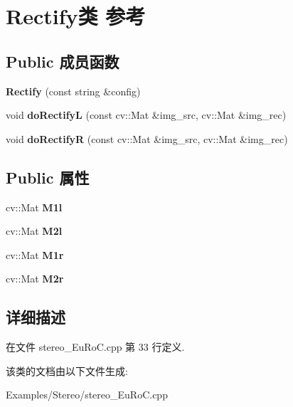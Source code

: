 \hypertarget{classRectify}{\section{Rectify类 参考}
\label{classRectify}
}
\subsection*{Public 成员函数}
\begin{DoxyCompactItemize}
\item 
\hypertarget{classRectify_af902b42675372fe6d368d7db9f8f4aeb}{{\bfseries Rectify} (const string \&config)}\label{classRectify_af902b42675372fe6d368d7db9f8f4aeb}

\item 
\hypertarget{classRectify_ab13cffcfad378e7fe0e2acc30b34b898}{void {\bfseries do\-Rectify\-L} (const cv\-::\-Mat \&img\-\_\-src, cv\-::\-Mat \&img\-\_\-rec)}\label{classRectify_ab13cffcfad378e7fe0e2acc30b34b898}

\item 
\hypertarget{classRectify_a730bcf1354cf3235bc968e6614fac588}{void {\bfseries do\-Rectify\-R} (const cv\-::\-Mat \&img\-\_\-src, cv\-::\-Mat \&img\-\_\-rec)}\label{classRectify_a730bcf1354cf3235bc968e6614fac588}

\end{DoxyCompactItemize}
\subsection*{Public 属性}
\begin{DoxyCompactItemize}
\item 
\hypertarget{classRectify_a2bccf95a2c08fd34ecba598b6ace5f3b}{cv\-::\-Mat {\bfseries M1l}}\label{classRectify_a2bccf95a2c08fd34ecba598b6ace5f3b}

\item 
\hypertarget{classRectify_a5b6d2e9cf6d4e5db0ca0f75247fdb120}{cv\-::\-Mat {\bfseries M2l}}\label{classRectify_a5b6d2e9cf6d4e5db0ca0f75247fdb120}

\item 
\hypertarget{classRectify_a38bed768da331d8097e03b4cb9c6c96e}{cv\-::\-Mat {\bfseries M1r}}\label{classRectify_a38bed768da331d8097e03b4cb9c6c96e}

\item 
\hypertarget{classRectify_a57ade3e3cb60f17a6fae8095fd79bc6c}{cv\-::\-Mat {\bfseries M2r}}\label{classRectify_a57ade3e3cb60f17a6fae8095fd79bc6c}

\end{DoxyCompactItemize}


\subsection{详细描述}


在文件 stereo\-\_\-\-Eu\-Ro\-C.\-cpp 第 33 行定义.



该类的文档由以下文件生成\-:\begin{DoxyCompactItemize}
\item 
Examples/\-Stereo/stereo\-\_\-\-Eu\-Ro\-C.\-cpp\end{DoxyCompactItemize}
